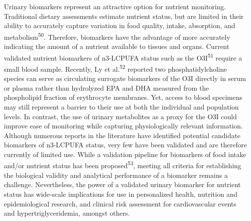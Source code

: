 \documentclass[journal=jacsat,manuscript=article]{achemso}
\begin{document}
Urinary biomarkers represent an attractive option for nutrient
monitoring. Traditional dietary assessments estimate nutrient status,
but are limited in their ability to accurately capture variation in food
quality, intake, absorption, and metabolism\textsuperscript{50}.
Therefore, biomarkers have the advantage of more accurately indicating
the amount of a nutrient available to tissues and organs. Current
validated nutrient biomarkers of n3-LCPUFA status such as the
O3I\textsuperscript{51} require a small blood sample. Recently, Ly et
al.\textsuperscript{52} reported two phosphatidylcholine species can
serve as circulating surrogate biomarkers of the O3I directly in serum
or plasma rather than hydrolyzed EPA and DHA measured from the
phospholipid fraction of erythrocyte membranes. Yet, access to blood
specimens may still represent a barrier to their use at both the
individual and population levels. In contrast, the use of urinary
metabolites as a proxy for the O3I could improve ease of monitoring
while capturing physiologically relevant information. Although numerous
reports in the literature have identified potential candidate biomarkers
of n3-LCPUFA status, very few have been validated and are therefore
currently of limited use. While a validation pipeline for biomarkers of
food intake and/or nutrient status has been
proposed\textsuperscript{53}, meeting all criteria for establishing the
biological validity and analytical performance of a biomarker remains a
challenge. Nevertheless, the power of a validated urinary biomarker for
nutrient status has wide-scale implications for use in personalized
health, nutrition and epidemiological research, and clinical risk
assessment for cardiovascular events and hypertriglyceridemia, amongst
others.
\end{document}
